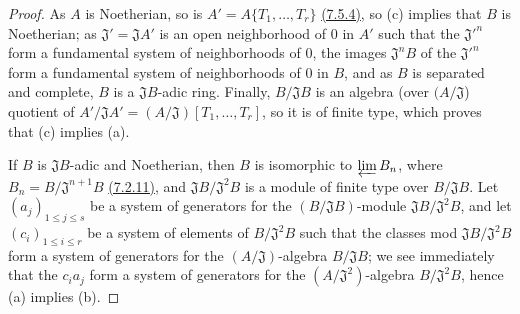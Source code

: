 \begin{proof}
\label{proof-prop-0.7.5.5}
As $A$ is Noetherian, so is $A'=A\{T_1,\dots,T_r\}$ \hyperref[prop-0.7.5.4]{(7.5.4)}, so
(c) implies that $B$ is Noetherian; as $\mathfrak{J}'=\mathfrak{J}A'$ is an open neighborhood
of $0$ in $A'$ such that the ${\mathfrak{J}'}^n$ form a fundamental system of neighborhoods of
$0$, the images $\mathfrak{J}^n B$ of the ${\mathfrak{J}'}^n$ form a fundamental system of
neighborhoods of $0$ in $B$, and as $B$ is separated and complete, $B$ is a $\mathfrak{J}B$-adic
ring. Finally, $B/\mathfrak{J}B$ is an algebra (over $(A/\mathfrak{J}$) quotient of
$A'/\mathfrak{J}A'=(A/\mathfrak{J})[T_1,\dots,T_r]$, so it is of finite type, which proves that
(c) implies (a).

If $B$ is $\mathfrak{J}B$-adic and Noetherian, then $B$ is isomorphic to $\varprojlim B_n$, where
$B_n=B/\mathfrak{J}^{n+1}B$ \hyperref[rmk-0.7.2.11]{(7.2.11)}, and $\mathfrak{J}B/\mathfrak{J}^2 B$
is a module of finite type over $B/\mathfrak{J}B$. Let $(a_j)_{1\leqslant j\leqslant s}$ be a
system of generators for the $(B/\mathfrak{J}B)$-module $\mathfrak{J}B/\mathfrak{J}^2 B$, and let
$(c_i)_{1\leqslant i\leqslant r}$ be a system of elements of $B/\mathfrak{J}^2 B$ such that the
classes
mod $\mathfrak{J}B/\mathfrak{J}^2 B$ form a system of generators for the $(A/\mathfrak{J})$-algebra
$B/\mathfrak{J}B$; we see immediately that the $c_i a_j$ form a system of generators for the
$(A/\mathfrak{J}^2)$-algebra $B/\mathfrak{J}^2 B$, hence (a) implies (b).


\end{proof}

